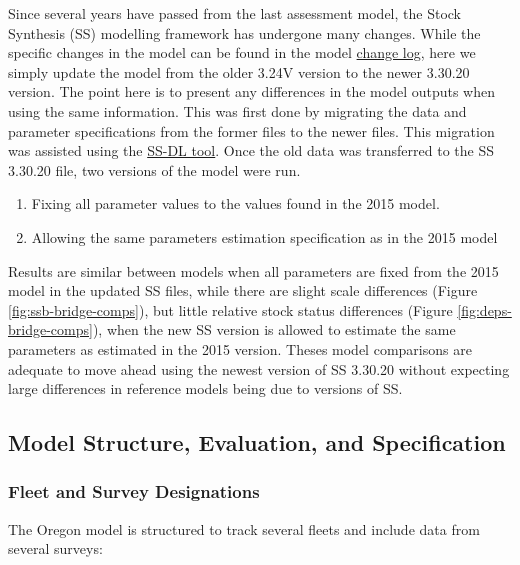 \documentclass[11pt,
  english,
  letterpaper,
]{article}
\providecommand{\tightlist}{%
  \setlength{\itemsep}{0pt}\setlength{\parskip}{0pt}}
\providecommand{\tightlist}{%
  \setlength{\itemsep}{0pt}\setlength{\parskip}{0pt}}
\begin{document}
Since several years have passed from the last assessment model, the Stock Synthesis (SS) modelling framework has undergone many changes. While the specific changes in the model can be found in the model \href{https://github.com/nmfs-stock-synthesis/stock-synthesis/blob/v3.30.19/Change_log_for_SS_3.30.xlsx?raw=true}{change log}, here we simply update the model from the older 3.24V version to the newer 3.30.20 version. The point here is to present any differences in the model outputs when using the same information. This was first done by migrating the data and parameter specifications from the former files to the newer files. This migration was assisted using the \href{https://github.com/shcaba/SS-DL-tool}{SS-DL tool}. Once the old data was transferred to the SS 3.30.20 file, two versions of the model were run.

\begin{enumerate}
\def\labelenumi{\arabic{enumi})}
\tightlist
\item
  Fixing all parameter values to the values found in the 2015 model.
\item
  Allowing the same parameters estimation specification as in the 2015 model
\end{enumerate}

Results are similar between models when all parameters are fixed from the 2015 model in the updated SS files, while there are slight scale differences (Figure \ref{fig:ssb-bridge-comps}), but little relative stock status differences (Figure \ref{fig:deps-bridge-comps}), when the new SS version is allowed to estimate the same parameters as estimated in the 2015 version. Theses model comparisons are adequate to move ahead using the newest version of SS 3.30.20 without expecting large differences in reference models being due to versions of SS.

\hypertarget{model-structure-evaluation-and-specification}{%
\subsection{Model Structure, Evaluation, and Specification}\label{model-structure-evaluation-and-specification}}

\hypertarget{fleet-and-survey-designations}{%
\subsubsection{Fleet and Survey Designations}\label{fleet-and-survey-designations}}

The Oregon model is structured to track several fleets and include data from several surveys:
\end{document}
